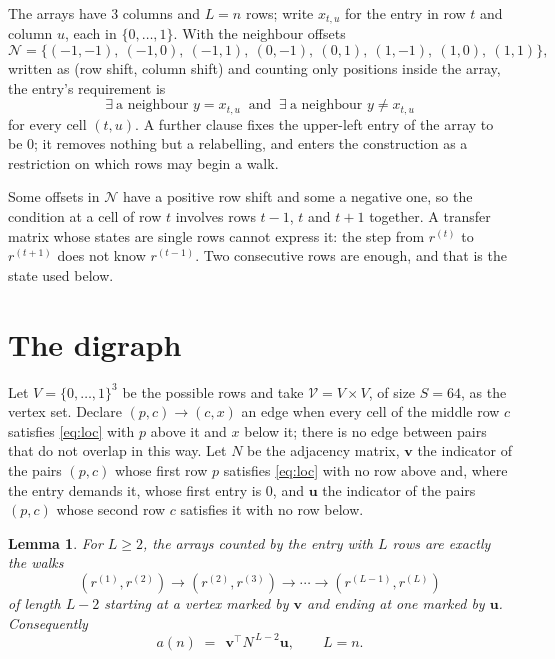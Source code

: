 \documentclass[11pt,a4paper]{article}
\theoremstyle{plain}
\newtheorem{lemma}[theorem]{Lemma}
\theoremstyle{definition}
\begin{document}
The arrays have $3$ columns and $L=n$ rows; write $x_{t,u}$ for the entry in
row $t$ and column $u$, each in $\{0,\dots,1\}$. With the neighbour offsets
\[
\mathcal N=\{(-1,-1),\ (-1,0),\ (-1,1),\ (0,-1),\ (0,1),\ (1,-1),\ (1,0),\ (1,1)\},
\]
written as (row shift, column shift) and counting only positions inside the array, the
entry's requirement is
\begin{equation}\label{eq:loc}
\exists\ \text{a neighbour }y=x_{t,u}\ \text{ and }\ \exists\ \text{a neighbour }y\ne x_{t,u}
\end{equation}
for every cell $(t,u)$. A further clause fixes the upper-left entry of the array to be $0$; it removes nothing but a relabelling, and enters the construction as a restriction on which rows may begin a walk.

Some offsets in $\mathcal N$ have a positive row shift and some a negative one, so the
condition at a cell of row $t$ involves rows $t-1$, $t$ and $t+1$ together. A transfer
matrix whose states are single rows cannot express it: the step from $r^{(t)}$ to
$r^{(t+1)}$ does not know $r^{(t-1)}$. Two consecutive rows are enough, and that is
the state used below.

\section{The digraph}

Let $V=\{0,\dots,1\}^{3}$ be the possible rows and take
$\mathcal V=V\times V$, of size $S=64$, as the vertex set. Declare $(p,c)\to(c,x)$ an edge
when every cell of the middle row $c$ satisfies \eqref{eq:loc} with $p$ above it and $x$
below it; there is no edge between pairs that do not overlap in this way. Let $N$ be the
adjacency matrix, $\mathbf{v}$ the indicator of the pairs $(p,c)$ whose first row $p$
satisfies \eqref{eq:loc} with no row above and, where the entry demands it, whose first entry is $0$, and $\mathbf{u}$ the indicator of
the pairs $(p,c)$ whose second row $c$ satisfies it with no row below.

\begin{lemma}\label{lem:walk}
For $L\ge2$, the arrays counted by the entry with $L$ rows are exactly the walks
\[
(r^{(1)},r^{(2)})\to(r^{(2)},r^{(3)})\to\cdots\to(r^{(L-1)},r^{(L)})
\]
of length $L-2$ starting at a vertex marked by $\mathbf{v}$ and ending at one marked by
$\mathbf{u}$. Consequently
\[
a(n)\;=\;\,\mathbf{v}^{\!\top}N^{\,L-2}\mathbf{u},\qquad L=n .
\]
\end{lemma}
\end{document}
